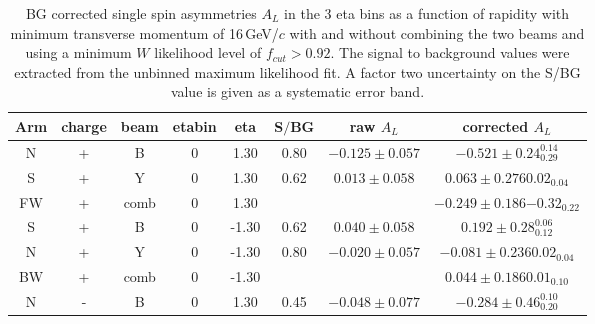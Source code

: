 \begin{table}
\begin{center}
\begin{tabular}{|c c c |c c | c|c| c|}
 \hline 
\end{tabular}
\end{center}
\end{table}
%

\begin{table}
\begin{center}
\caption{BG corrected single spin asymmetries $A_L$ in the 3 eta bins as a function of rapidity with minimum transverse momentum of 
16\,GeV/$c$ with and without combining the two beams and using a minimum $W$ likelihood level of $f_{cut} > 0.92$. 
The signal to background values were extracted from the unbinned maximum likelihood fit. A factor two uncertainty on the 
S/BG value is given as a systematic error band.\label{Tab:Dat:finalasy}}
\begin{tabular}{|c c c |c c | c|c| c|}
\hline 
Arm & charge & beam & etabin &  eta & S$/$BG & raw $A_L$ & corrected  $A_L$ \\ \hline 
  N &     +  &   B  & 0 &  1.30 & 0.80 & $-0.125\pm  0.057$ & $  -0.521\pm  0.24 ^{0.14} _{0.29} $\\
  S &     +  &   Y  & 0 &  1.30 & 0.62 & $ 0.013\pm  0.058$ & $  0.063 \pm 0.27 6{0.02} _{0.04}$ \\ 
 FW &     +  & comb & 0 &  1.30 & &&$  -0.249 \pm 0.18 6{ -0.32} _{0.22} $\\ \hline 
  S &     +  &   B  & 0 & -1.30 & 0.62 & $ 0.040\pm  0.058$ & $   0.192\pm  0.28 ^{0.06} _{0.12} $\\
  N &     +  &   Y  & 0 & -1.30 & 0.80 & $-0.020\pm  0.057$ & $ -0.081 \pm 0.23 6{0.02} _{0.04}$ \\ 
 BW &     +  & comb & 0 & -1.30 & &&$   0.044 \pm 0.18 6{ 0.01} _{0.10} $\\ \hline 
  N &     -  &   B  & 0 &  1.30 & 0.45 & $-0.048\pm  0.077$ & $  -0.284\pm  0.46 ^{0.10} _{0.20} $\\

\end{tabular}
\end{center}
\end{table}
